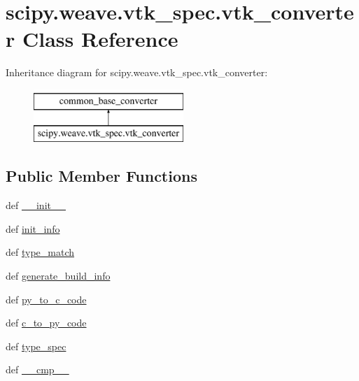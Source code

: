 \hypertarget{classscipy_1_1weave_1_1vtk__spec_1_1vtk__converter}{}\section{scipy.\+weave.\+vtk\+\_\+spec.\+vtk\+\_\+converter Class Reference}
\label{classscipy_1_1weave_1_1vtk__spec_1_1vtk__converter}
Inheritance diagram for scipy.\+weave.\+vtk\+\_\+spec.\+vtk\+\_\+converter\+:\begin{figure}[H]
\begin{center}
\leavevmode
\includegraphics[height=2.000000cm]{classscipy_1_1weave_1_1vtk__spec_1_1vtk__converter}
\end{center}
\end{figure}
\subsection*{Public Member Functions}
\begin{DoxyCompactItemize}
\item 
def \hyperlink{classscipy_1_1weave_1_1vtk__spec_1_1vtk__converter_a3c351c94f53f11f232ed00e4f5a39b8e}{\+\_\+\+\_\+init\+\_\+\+\_\+}
\item 
def \hyperlink{classscipy_1_1weave_1_1vtk__spec_1_1vtk__converter_a11e7f1e8b13a30ad19f953e155881f2b}{init\+\_\+info}
\item 
def \hyperlink{classscipy_1_1weave_1_1vtk__spec_1_1vtk__converter_af5c2a80e562ba9d76e33ce235aa52682}{type\+\_\+match}
\item 
def \hyperlink{classscipy_1_1weave_1_1vtk__spec_1_1vtk__converter_a3e28911be989d8c1ca6ee3329e2efaf5}{generate\+\_\+build\+\_\+info}
\item 
def \hyperlink{classscipy_1_1weave_1_1vtk__spec_1_1vtk__converter_aaa86c2d41a9083117d817466053a3b5d}{py\+\_\+to\+\_\+c\+\_\+code}
\item 
def \hyperlink{classscipy_1_1weave_1_1vtk__spec_1_1vtk__converter_a4e32430ce28f2478c64cd35c2d6ce79c}{c\+\_\+to\+\_\+py\+\_\+code}
\item 
def \hyperlink{classscipy_1_1weave_1_1vtk__spec_1_1vtk__converter_ad0580dece0d3f70892fb65219821b67f}{type\+\_\+spec}
\item 
def \hyperlink{classscipy_1_1weave_1_1vtk__spec_1_1vtk__converter_a307fe1f30d12af884596d955848800f7}{\+\_\+\+\_\+cmp\+\_\+\+\_\+}
\end{DoxyCompactItemize}

